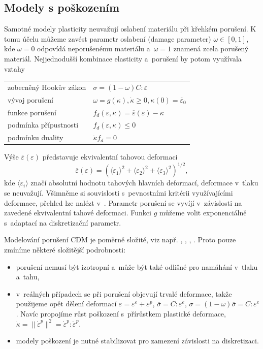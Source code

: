 \documentclass{article}
\begin{document}
\subsection{Modely s poškozením}
Samotné modely plasticity neuvažují oslabení materiálu při křehkém porušení. K tomu účelu můžeme zavést parametr oslabení (damage parameter) $\omega\in[0,1]$, kde $\omega = 0$ odpovídá neporušenému materiálu a~$\omega = 1$ znamená zcela porušený materiál.
Nejjednodušší kombinace elasticity a~porušení by potom využívala vztahy
\begin{table}[h!]
	\centering
	\begin{tabular}{ll}
		\hline
		zobecněný Hookův zákon & $\sigma = (1-\omega)C : \varepsilon$\\
		vývoj porušení & $\omega = g(\kappa), \dot{\kappa} \geq 0, \kappa(0) = \overline{\varepsilon}_0$\\
		funkce porušení & $f_d(\varepsilon,\kappa)=\overline{\varepsilon}(\varepsilon)-\kappa$\\
		podmínka přípustnosti & $f_d(\varepsilon,\kappa)\leq 0$ \\
		podmínku duality & $\dot{\kappa} f_d =0$\\
		\hline
	\end{tabular}
\end{table}

Výše $\overline{\varepsilon}(\varepsilon)$ představuje ekvivalentní tahovou deformaci
$$
	\overline{\varepsilon}(\varepsilon) = (\langle\varepsilon_1\rangle^2+\langle\varepsilon_2\rangle^2+\langle\varepsilon_3\rangle^2)^{1/2},
$$
kde $\langle\varepsilon_i\rangle$ značí absolutní hodnotu tahových hlavních deformací, deformace
v~tlaku se neuvažují. Všimněme si souvislosti s~pevnostními kritérii využívajícími deformace, přehled lze nalézt v~\cite{kwasniewski_strain_based_2010}.
Parametr porušení se vyvíjí v~závislosti na zavedené ekvivalentní tahové deformaci. Funkci $g$ můžeme volit exponenciálně s~adaptací na diskretizační parametr.

Modelování porušení CDM je poměrně složité, viz např. \cite{Lemaitre1992}, \cite{Neto2011}, \cite{GJ06}, \cite{UH15}. Proto pouze zmíníme některé složitější podrobnosti:
\begin{itemize}
	\item porušení nemusí být izotropní a~může být také odlišné pro namáhání v~tlaku a~tahu,
	\item v~reálných případech se při porušení objevují trvalé deformace, takže
	použijeme opět dělení deformací $\varepsilon=\varepsilon^e + \varepsilon^p$, $\overline{\sigma} = C : \varepsilon^e$, $\sigma = (1-\omega)\overline{\sigma} = C : \varepsilon^e$. Navíc propojíme růst poškození s~přírůstkem plastické deformace, $\dot{\kappa} = \|\dot{\varepsilon}^p\|^2 = \dot{\varepsilon}^p : \dot{\varepsilon}^p$.
	\item modely poškození je nutné stabilizovat pro zamezení závislosti na diskretizaci.
\end{itemize}
\end{document}
